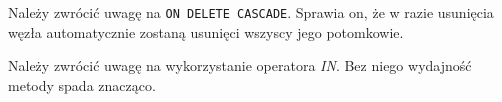 



Należy zwrócić uwagę na  \texttt{ON DELETE CASCADE}. 
Sprawia on, że w razie usunięcia węzła  
automatycznie zostaną usunięci wszyscy jego potomkowie.



















Należy zwrócić uwagę na wykorzystanie operatora \emph{IN}. Bez niego wydajność metody spada znacząco. 

